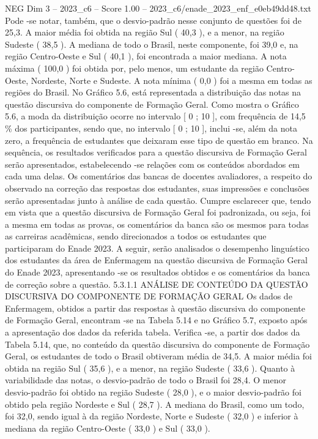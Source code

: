 \begin{textsample}{NEG Dim 3 – 2023\_c6 – Score 1.00 – 2023\_c6/enade\_2023\_enf\_e0eb49dd48.txt}
Pode -se notar, também, que o desvio-padrão nesse conjunto de questões foi de 25,3.
A maior média foi obtida na região Sul ( 40,3 ), e a menor, na região Sudeste ( 38,5 ).
A mediana de todo o Brasil, neste componente, foi 39,0 e, na região Centro-Oeste e Sul ( 40,1 ), foi encontrada a maior mediana.
A nota máxima ( 100,0 ) foi obtida por, pelo menos, um estudante da região Centro-Oeste, Nordeste, Norte e Sudeste.
A nota mínima ( 0,0 ) foi a mesma em todas as regiões do Brasil.
No Gráfico 5.6, está representada a distribuição das notas na questão discursiva do componente de Formação Geral.
Como mostra o Gráfico 5.6, a moda da distribuição ocorre no intervalo [ 0 ; 10 ], com frequência de 14,5 \% dos participantes, sendo que, no intervalo [ 0 ; 10 ], inclui -se, além da nota zero, a frequência de estudantes que deixaram esse tipo de questão em branco.
Na sequência, os resultados verificados para a questão discursiva de Formação Geral serão apresentados, estabelecendo -se relações com os conteúdos abordados em cada uma delas.
Os comentários das bancas de docentes avaliadores, a respeito do observado na correção das respostas dos estudantes, suas impressões e conclusões serão apresentadas junto à análise de cada questão.
Cumpre esclarecer que, tendo em vista que a questão discursiva de Formação Geral foi padronizada, ou seja, foi a mesma em todas as provas, os comentários da banca são os mesmos para todas as carreiras acadêmicas, sendo direcionados a todos os estudantes que participaram do Enade 2023.
A seguir, serão analisados o desempenho linguístico dos estudantes da área de Enfermagem na questão discursiva de Formação Geral do Enade 2023, apresentando -se os resultados obtidos e os comentários da banca de correção sobre a questão. 5.3.1.1 ANÁLISE DE CONTEÚDO DA QUESTÃO DISCURSIVA DO COMPONENTE DE FORMAÇÃO GERAL Os dados de Enfermagem, obtidos a partir das respostas à questão discursiva do componente de Formação Geral, encontram -se na Tabela 5.14 e no Gráfico 5.7, exposto após a apresentação dos dados da referida tabela.
Verifica -se, a partir dos dados da Tabela 5.14, que, no conteúdo da questão discursiva do componente de Formação Geral, os estudantes de todo o Brasil obtiveram média de 34,5.
A maior média foi obtida na região Sul ( 35,6 ), e a menor, na região Sudeste ( 33,6 ).
Quanto à variabilidade das notas, o desvio-padrão de todo o Brasil foi 28,4.
O menor desvio-padrão foi obtido na região Sudeste ( 28,0 ), e o maior desvio-padrão foi obtido pela região Nordeste e Sul ( 28,7 ).
A mediana do Brasil, como um todo, foi 32,0, sendo igual à da região Nordeste, Norte e Sudeste ( 32,0 ) e inferior à mediana da região Centro-Oeste ( 33,0 ) e Sul ( 33,0 ).

\end{textsample}
